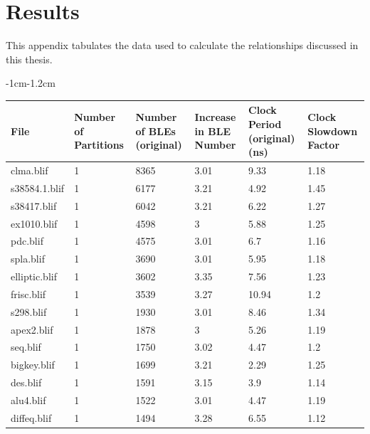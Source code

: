 \documentclass[12pt,final,oneside]{dwThesis} %
\begin{document}
   \appendix 
   \chapter{Results}
   This appendix tabulates the data used to
   calculate the relationships discussed in this thesis.


   \begin{table}
      \footnotesize 
      \begin{adjustwidth}
         {-1cm}{-1.2cm}

         \begin{tabularx}
            {1.1\textwidth}{XXXXXX} \toprule File & Number of
            Partitions &  Number of BLEs (original) &  Increase in BLE
            Number &  Clock Period (original) (ns) &  Clock Slowdown
            Factor\\
            \midrule clma.blif & 1 & 8365 & 3.01 & 9.33 & 1.18\\

            s38584.1.blif & 1 & 6177 & 3.21 & 4.92 & 1.45\\
            s38417.blif & 1
            & 6042 & 3.21 & 6.22 & 1.27\\
            ex1010.blif & 1 & 4598 & 3 & 5.88
            & 1.25\\
            pdc.blif & 1 & 4575 & 3.01 & 6.7 & 1.16\\
            spla.blif & 1
            & 3690 & 3.01 & 5.95 & 1.18\\
            elliptic.blif & 1 & 3602 & 3.35 &
            7.56 & 1.23\\
            frisc.blif & 1 & 3539 & 3.27 & 10.94 & 1.2\\

            s298.blif & 1 & 1930 & 3.01 & 8.46 & 1.34\\
            apex2.blif & 1 &
            1878 & 3 & 5.26 & 1.19\\
            seq.blif & 1 & 1750 & 3.02 & 4.47 &
            1.2\\
            bigkey.blif & 1 & 1699 & 3.21 & 2.29 & 1.25\\
            des.blif & 1
            & 1591 & 3.15 & 3.9 & 1.14\\
            alu4.blif & 1 & 1522 & 3.01 & 4.47
            & 1.19\\
            diffeq.blif & 1 & 1494 & 3.28 & 6.55 & 1.12\\


\end{tabularx}
\end{adjustwidth}
\end{table}
\end{document}
